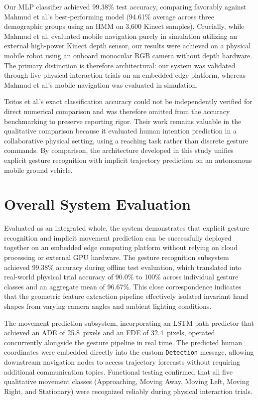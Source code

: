 Our MLP classifier achieved 99.38\% test accuracy, comparing favorably against Mahmud et al.'s best-performing model (94.61\% average across three demographic groups using an HMM on 3,600 Kinect samples). Crucially, while Mahmud et al. evaluated mobile navigation purely in simulation utilizing an external high-power Kinect depth sensor, our results were achieved on a physical mobile robot using an onboard monocular RGB camera without depth hardware. The primary distinction is therefore architectural: our system was validated through live physical interaction trials on an embedded edge platform, whereas Mahmud et al.'s mobile navigation was evaluated in simulation.

Tsitos et al.'s exact classification accuracy could not be independently verified for direct numerical comparison and was therefore omitted from the accuracy benchmarking to preserve reporting rigor. Their work remains valuable in the qualitative comparison because it evaluated human intention prediction in a collaborative physical setting, using a reaching task rather than discrete gesture commands. By comparison, the architecture developed in this study unifies explicit gesture recognition with implicit trajectory prediction on an autonomous mobile ground vehicle.

\section{Overall System Evaluation}
Evaluated as an integrated whole, the system demonstrates that explicit gesture recognition and implicit movement prediction can be successfully deployed together on an embedded edge computing platform without relying on cloud processing or external GPU hardware. The gesture recognition subsystem achieved 99.38\% accuracy during offline test evaluation, which translated into real-world physical trial accuracy of 90.0\% to 100\% across individual gesture classes and an aggregate mean of 96.67\%. This close correspondence indicates that the geometric feature extraction pipeline effectively isolated invariant hand shapes from varying camera angles and ambient lighting conditions.

The movement prediction subsystem, incorporating an LSTM path predictor that achieved an ADE of 25.8~pixels and an FDE of 32.4~pixels, operated concurrently alongside the gesture pipeline in real time. The predicted human coordinates were embedded directly into the custom \texttt{Detection} message, allowing downstream navigation nodes to access trajectory forecasts without requiring additional communication topics. Functional testing confirmed that all five qualitative movement classes (Approaching, Moving Away, Moving Left, Moving Right, and Stationary) were recognized reliably during physical interaction trials.

